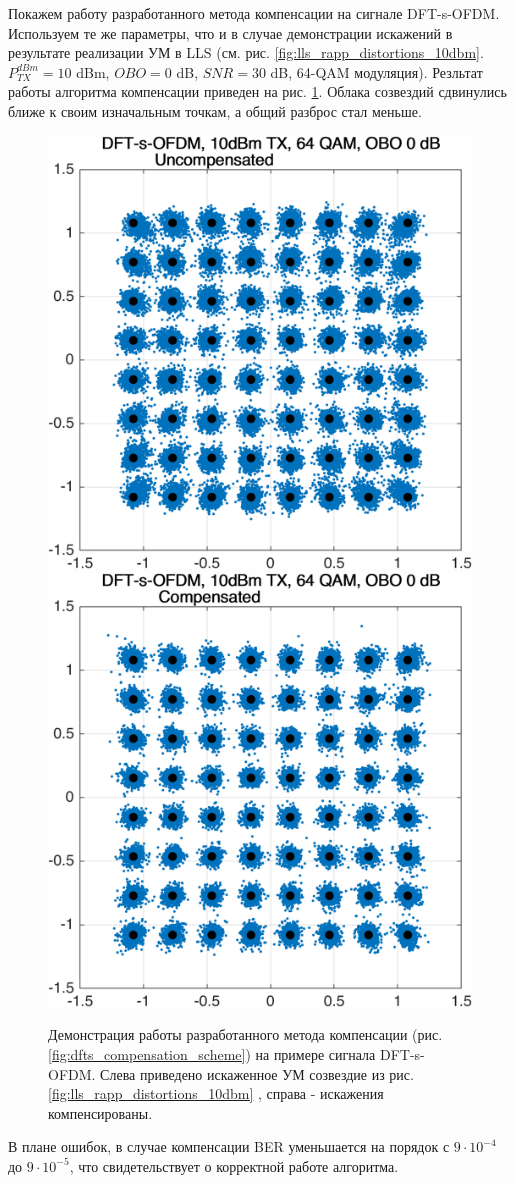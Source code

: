 Покажем работу разработанного метода компенсации на сигнале DFT-s-OFDM.
Используем те же параметры, что и в случае демонстрации искажений в
результате реализации УМ в LLS (см. рис.
\ref{fig:lls_rapp_distortions_10dbm}. $P^{dBm}_{TX} = 10$ dBm, $OBO = 0$
dB, $SNR=30$ dB, 64-QAM модуляция). Резльтат работы алгоритма компенсации
приведен на рис. \ref{fig:dfts_lls_compensation_10dbm}. Облака созвездий
сдвинулись ближе к своим изначальным точкам, а общий разброс стал меньше.

\begin{figure}[h!]
    \centering
    \includegraphics[width=0.45\linewidth]{figs/dfts_10dbm_obo0_uncompensated.png}
    \includegraphics[width=0.45\linewidth]{figs/dfts_10dbm_obo0_compensated.png}
    \caption{Демонстрация работы разработанного метода компенсации (рис.
    \ref{fig:dfts_compensation_scheme}) на примере сигнала DFT-s-OFDM.
    Слева приведено искаженное УМ созвездие из рис.
    \ref{fig:lls_rapp_distortions_10dbm} , справа - искажения
    компенсированы.}
    \label{fig:dfts_lls_compensation_10dbm}
\end{figure}

В плане ошибок, в случае компенсации BER уменьшается на порядок с $9\cdot
10^{-4}$ до $9\cdot 10^{-5}$, что свидетельствует о корректной работе
алгоритма.



